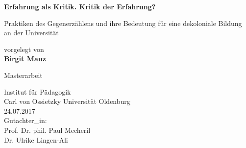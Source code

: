 \documentclass[11pt]{article}
\begin{document}
\onehalfspacing
\setlength{\epigraphwidth}{0.7\textwidth}
\begin{titlepage}
    \begin{center}
        \vspace*{1cm}
        
        \huge
        \textbf{Erfahrung als Kritik. Kritik der Erfahrung?}
        
        \vspace{0.5cm}
        \LARGE
Praktiken des Gegenerzählens und ihre Bedeutung für eine dekoloniale Bildung an der Universität
        
        \vspace{1.5cm}
        
        vorgelegt von\\
        \textbf{Birgit Manz}
        
        \vfill
       
        Masterarbeit
                
        \vspace{0.8cm}
     
        
        \Large
        Institut für Pädagogik\\
        Carl von Ossietzky Universität Oldenburg\\
        24.07.2017\\
        \vspace{1.5cm} 
        Gutachter\_in: \\[0.75em]
          Prof. Dr. phil. Paul Mecheril
          \\[0.2em]
          Dr. Ulrike Lingen-Ali

        \end{center}

\end{titlepage}


\tableofcontents













\end{document}
